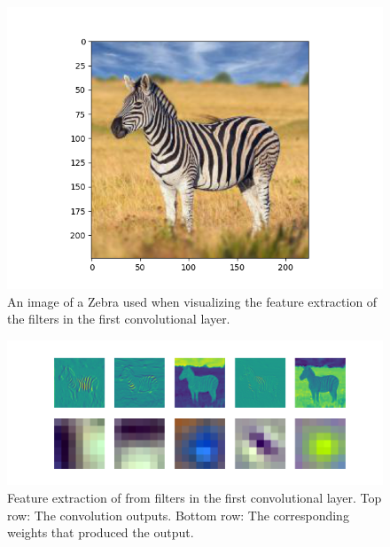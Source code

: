 \documentclass{article}
\begin{document}
\begin{figure}[H]
    \centering
    \includegraphics[width=\textwidth]{Assignments/Assignment_3/plots/zebra.png}
    \caption{An image of a Zebra used when visualizing the feature extraction of the filters in the first convolutional layer.}
    \label{fig:zebra}
\end{figure}

\begin{figure}[H]
    \centering
    \includegraphics[width=\textwidth]{Assignments/Assignment_3/plots/zebra_all.png}
    \caption{Feature extraction of from filters in the first convolutional layer. Top row: The convolution outputs. Bottom row: The corresponding weights that produced the output.}
    \label{fig:zebra_feature}
\end{figure}
\end{document}
